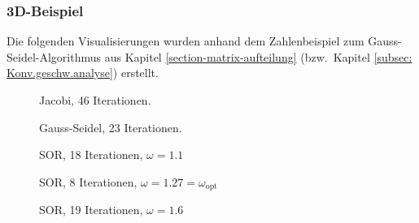 \begin{refsection}
\subsubsection{3D-Beispiel}
Die folgenden Visualisierungen wurden anhand dem Zahlenbeispiel zum
Gauss-Seidel-Algorithmus aus Kapitel \ref{section-matrix-aufteilung}
(bzw.~Kapitel \ref{subsec: Konv.geschw.analyse}) erstellt.
\begin{figure}[!ht]\centering
	\caption{Jacobi, 46 Iterationen.}
	\label{fig:Jac. 3D Bsp}
\end{figure}
\begin{figure}[!ht]\centering
	\caption{Gauss-Seidel, 23 Iterationen.}
	\label{fig:G.-S. 3D Bsp}
\end{figure}
\begin{figure}[!ht]\centering
	\caption{SOR, 18 Iterationen, $\omega=1.1$}
	\label{fig:SOR w=1.1 3D Bsp}
\end{figure}
\begin{figure}[!ht]\centering
	\caption{SOR, 8 Iterationen, $\omega=1.27=\omega_{\text{opt}}$}
	\label{fig:SOR w=1.27 3D Bsp}
\end{figure}
\begin{figure}[!ht]\centering
	\caption{SOR, 19 Iterationen, $\omega=1.6$}
	\label{fig:SOR w=1.6 3D Bsp}
\end{figure}
			

\end{refsection}
